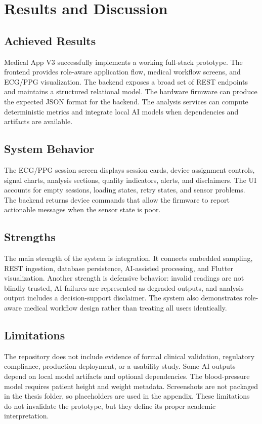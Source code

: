 \chapter{Results and Discussion}

\section{Achieved Results}

Medical App V3 successfully implements a working full-stack prototype. The frontend provides role-aware application flow, medical workflow screens, and ECG/PPG visualization. The backend exposes a broad set of REST endpoints and maintains a structured relational model. The hardware firmware can produce the expected JSON format for the backend. The analysis services can compute deterministic metrics and integrate local AI models when dependencies and artifacts are available.

\section{System Behavior}

The ECG/PPG session screen displays session cards, device assignment controls, signal charts, analysis sections, quality indicators, alerts, and disclaimers. The UI accounts for empty sessions, loading states, retry states, and sensor problems. The backend returns device commands that allow the firmware to report actionable messages when the sensor state is poor.

\section{Strengths}

The main strength of the system is integration. It connects embedded sampling, REST ingestion, database persistence, AI-assisted processing, and Flutter visualization. Another strength is defensive behavior: invalid readings are not blindly trusted, AI failures are represented as degraded outputs, and analysis output includes a decision-support disclaimer. The system also demonstrates role-aware medical workflow design rather than treating all users identically.

\section{Limitations}

The repository does not include evidence of formal clinical validation, regulatory compliance, production deployment, or a usability study. Some AI outputs depend on local model artifacts and optional dependencies. The blood-pressure model requires patient height and weight metadata. Screenshots are not packaged in the thesis folder, so placeholders are used in the appendix. These limitations do not invalidate the prototype, but they define its proper academic interpretation.

